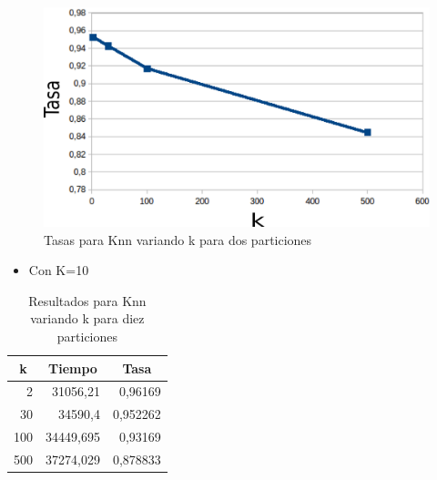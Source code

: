     \begin{figure}[H]
    \centering
    \includegraphics[scale=0.3]{Graficos/knnTasa2.png}
    \caption{Tasas para Knn variando k para dos particiones}
	\label{knnTasa2}
    \end{figure}
\bigskip
\bigskip
\bigskip






\begin{itemize}
\item Con K=10\\
\end{itemize}

\begin{center}

\begin{table}[H]
\centering
\begin{tabular}{|r|r|r|}
\hline
\multicolumn{1}{|c|}{k} & \multicolumn{1}{c|}{Tiempo} & \multicolumn{1}{c|}{Tasa} \\ \hline
2 & 31056,21 & 0,96169 \\ \hline
30 & 34590,4  & 0,952262 \\ \hline
100 & 34449,695 & 0,93169 \\ \hline
500 & 37274,029 & 0,878833 \\ \hline
\end{tabular}
\caption{Resultados para Knn variando k para diez particiones}
\label{}
\end{table}
\end{center}

\bigskip
\bigskip
\bigskip

